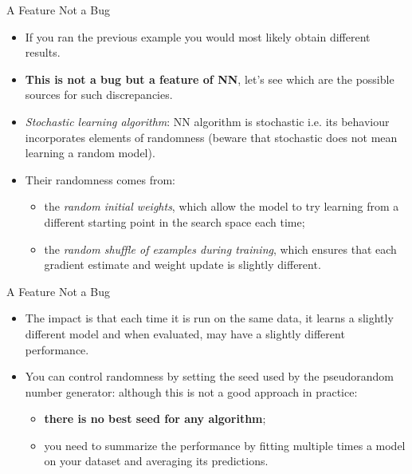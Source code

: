 \documentclass{beamer}
\begin{document}
\begin{frame}{A Feature Not a Bug}
  \begin{itemize}
    \item If you ran the previous example you would most likely obtain different results.
    \item \textbf{This is not a bug but a feature of NN}, let's see which are the possible sources for such discrepancies.
    \item \emph{Stochastic learning algorithm}: NN algorithm is stochastic i.e. its behaviour incorporates elements of randomness (beware that stochastic does not mean learning a random model). 
    \item Their randomness comes from:
      \begin{itemize}
        \item the \emph{random initial weights}, which allow the model to try learning from a different starting point in the search space each time; 
        \item the \emph{random shuffle of examples during training}, which ensures that each gradient estimate and weight update is slightly different.
      \end{itemize}
  \end{itemize}
\end{frame}

\begin{frame}{A Feature Not a Bug}
  \begin{itemize}
    \item The impact is that each time it is run on the same data, it learns a slightly different model and when evaluated, may have a slightly different performance.
    \item You can control randomness by setting the seed used by the pseudorandom number generator: although this is not a good approach in practice:
      \begin{itemize}
      \item \textbf{there is no best seed for any algorithm}; 
      \item you need to summarize the performance by fitting multiple times a model on your dataset and averaging its predictions.
      \end{itemize}
  \end{itemize}
\end{frame}
\end{document}
